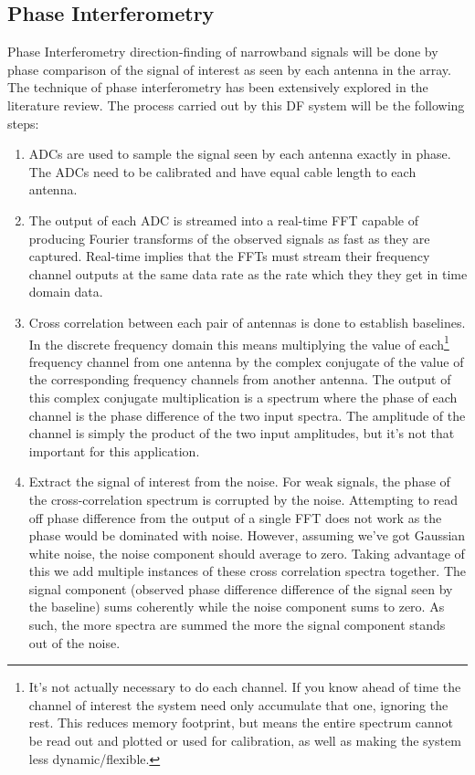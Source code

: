 \subsection{Phase Interferometry}
Phase Interferometry direction-finding of narrowband signals will be done by phase comparison of the signal of interest as seen by each antenna in the array. The technique of phase interferometry has been extensively explored in the literature review. The process carried out by this DF system will be the following steps:
\begin{enumerate}
  \item ADCs are used to sample the signal seen by each antenna exactly in phase. The ADCs need to be calibrated and have equal cable length to each antenna.
  \item The output of each ADC is streamed into a real-time FFT capable of producing Fourier transforms of the observed signals as fast as they are captured. Real-time implies that the FFTs must stream their frequency channel outputs at the same data rate as the rate which they they get in time domain data.
  \item Cross correlation between each pair of antennas is done to establish baselines. In the discrete frequency domain this means multiplying the value of each\footnote{It's not actually necessary to do each channel. If you know ahead of time the channel of interest the system need only accumulate that one, ignoring the rest. This reduces memory footprint, but means the entire spectrum cannot be read out and plotted or used for calibration, as well as making the system less dynamic/flexible.} frequency channel from one antenna by the complex conjugate of the value of the corresponding frequency channels from another antenna. The output of this complex conjugate multiplication is a spectrum where the phase of each channel is the phase difference of the two input spectra. The amplitude of the channel is simply the product of the two input amplitudes, but it's not that important for this application.
  \item Extract the signal of interest from the noise. For weak signals, the phase of the cross-correlation spectrum is corrupted by the noise. Attempting to read off phase difference from the output of a single FFT does not work as the phase would be dominated with noise. However, assuming we've got Gaussian white noise, the noise component should average to zero. Taking advantage of this we add multiple instances of these cross correlation spectra together. The signal component (observed phase difference difference of the signal seen by the baseline) sums coherently while the noise component sums to zero. As such, the more spectra are summed the more the signal component stands out of the noise.

\end{enumerate}

